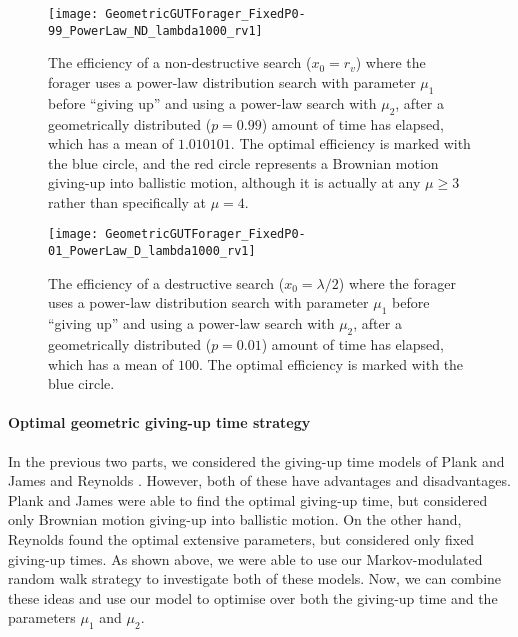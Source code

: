 \begin{figure}[h!]
	\centering
	\texttt{[image: GeometricGUTForager\_FixedP0-99\_PowerLaw\_ND\_lambda1000\_rv1]}
	\caption[Efficiency of two-state Markov-modulated power-law strategy, with giving-up parameter $p=0.99$, for non-destructive foraging]{The efficiency of a non-destructive search ($x_0=r_v$) where the forager uses a power-law distribution search with parameter $\mu_1$ before ``giving up'' and using a power-law search with $\mu_2$, after a geometrically distributed ($p=0.99$) amount of time has elapsed, which has a mean of $1.010101$. The optimal efficiency is marked with the blue circle, and the red circle represents a Brownian motion giving-up into ballistic motion, although it is actually at any $\mu \geq 3$ rather than specifically at $\mu =4$. \label{fig:GeometricGUTForager_PowerLaw_ND_p0.99}}
\end{figure}

\begin{figure}[h!]
	\centering
	\texttt{[image: GeometricGUTForager\_FixedP0-01\_PowerLaw\_D\_lambda1000\_rv1]}
	\caption[Efficiency of two-state Markov-modulated power-law strategy, with giving-up parameter $p=0.01$, for destructive foraging]{The efficiency of a destructive search ($x_0=\lambda/2$) where the forager uses a power-law distribution search with parameter $\mu_1$ before ``giving up'' and using a power-law search with $\mu_2$, after a geometrically distributed ($p=0.01$) amount of time has elapsed, which has a mean of $100$. The optimal efficiency is marked with the blue circle.\label{fig:GeometricGUTForager_PowerLaw_D_p0.01}}
\end{figure}

\FloatBarrier

\paragraph{Optimal geometric giving-up time strategy}

In the previous two parts, we considered the giving-up time models of Plank and James \cite{Plank_2008} and Reynolds \cite{Reynolds_2009_adaptive}. However, both of these have advantages and disadvantages. Plank and James \cite{Plank_2008} were able to find the optimal giving-up time, but considered only Brownian motion giving-up into ballistic motion. On the other hand, Reynolds \cite{Reynolds_2009_adaptive} found the optimal extensive parameters, but considered only fixed giving-up times. As shown above, we were able to use our Markov-modulated random walk strategy to investigate both of these models. Now, we can combine these ideas and use our model to optimise over both the giving-up time and the parameters $\mu_1$ and $\mu_2$.


